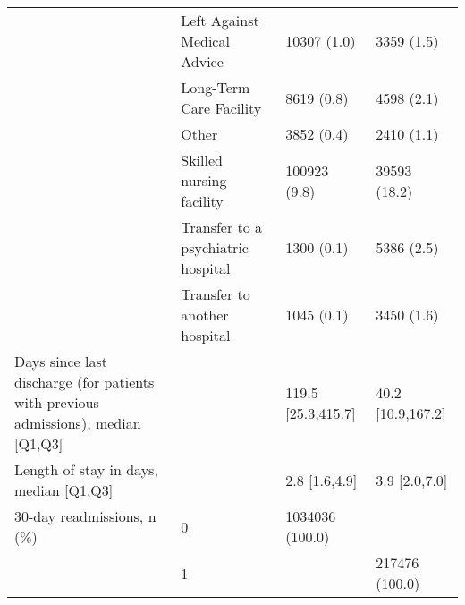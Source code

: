 \begin{tabular}{llll}
                           & Left Against Medical Advice &                    10307 (1.0) &         3359 (1.5) \\
                           & Long-Term Care Facility &                     8619 (0.8) &         4598 (2.1) \\
                           & Other &                     3852 (0.4) &         2410 (1.1) \\
                           & Skilled nursing facility &                   100923 (9.8) &       39593 (18.2) \\
                           & Transfer to a psychiatric hospital &                     1300 (0.1) &         5386 (2.5) \\
                           & Transfer to another hospital &                     1045 (0.1) &         3450 (1.6) \\
Days since last discharge (for patients with previous admissions), median [Q1,Q3] &   &             119.5 [25.3,415.7] &  40.2 [10.9,167.2] \\
Length of stay in days, median [Q1,Q3] &   &                  2.8 [1.6,4.9] &      3.9 [2.0,7.0] \\
30-day readmissions, n (\%) & 0 &                1034036 (100.0) &                    \\
                           & 1 &                                &     217476 (100.0) \\
\bottomrule
\end{tabular}
